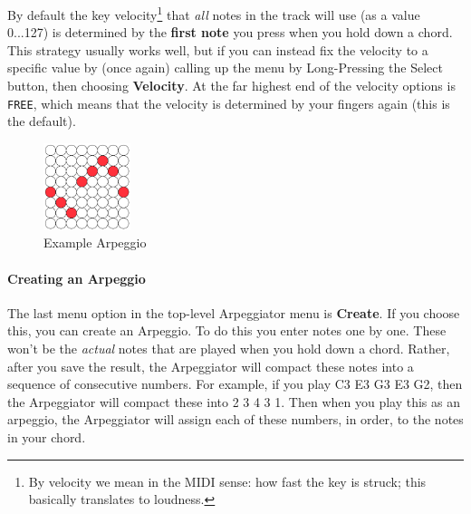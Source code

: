 \documentclass{article}
\begin{document}
By default the key velocity\footnote{By velocity we mean in the MIDI sense: how fast the key is struck; this basically translates to loudness.} that {\it all} notes in the track will use (as a value 0...127) is determined by the {\bf first note} you press when you hold down a chord.  This strategy usually works well, but if you can instead fix the velocity to a specific value by (once again) calling up the menu by Long-Pressing the Select button, then choosing {\bf Velocity}.  At the far highest end of the velocity options is \texttt{FREE}, which means that the velocity is determined by your fingers again (this is the default).

\begin{figure}
\begin{center}
\vspace{-2em}
\includegraphics[width=1in]{arpeggioexample.pdf}\\
Example Arpeggio\\[2em]
\end{center}
\vspace{-2em}
\label{arpeggioediting}
\end{figure}

\paragraph{Creating an Arpeggio}

The last menu option in the top-level Arpeggiator menu is {\bf Create}.  If you choose this, you can create an Arpeggio.  To do this you enter notes one by one.  These won't be the {\it actual} notes that are played when you hold down a chord.  Rather, after you save the result, the Arpeggiator will compact these notes into a sequence of consecutive numbers.  For example, if you play C3 E3 G3 E3 G2, then the Arpeggiator will compact these into 2 3 4 3 1.  Then when you play this as an arpeggio, the Arpeggiator will assign each of these numbers, in order, to the notes in your chord. 
\end{document}
